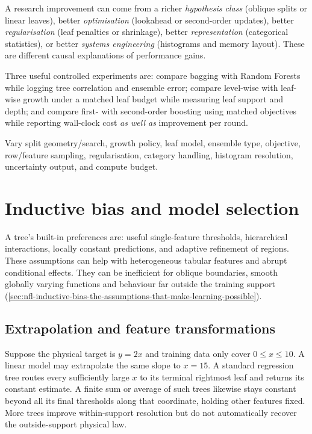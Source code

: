 A research improvement can come from a richer \emph{hypothesis class} (oblique splits or linear leaves), better \emph{optimisation} (lookahead or second-order updates), better \emph{regularisation} (leaf penalties or shrinkage), better \emph{representation} (categorical statistics), or better \emph{systems engineering} (histograms and memory layout).
These are different causal explanations of performance gains.

Three useful controlled experiments are: compare bagging with Random Forests while logging tree correlation and ensemble error; compare level-wise with leaf-wise growth under a matched leaf budget while measuring leaf support and depth; and compare first- with second-order boosting using matched objectives while reporting wall-clock cost \emph{as well as} improvement per round.

\begin{calloutdegreeofexperiment}
Vary split geometry/search, growth policy, leaf model, ensemble type, objective, row/feature sampling, regularisation, category handling, histogram resolution, uncertainty output, and compute budget.
\end{calloutdegreeofexperiment}

\section{Inductive bias and model selection}
\label{sec:trees-inductive-bias-and-model-selection}
A tree's built-in preferences are: useful single-feature thresholds, hierarchical interactions, locally constant predictions, and adaptive refinement of regions.
These assumptions can help with heterogeneous tabular features and abrupt conditional effects.
They can be inefficient for oblique boundaries, smooth globally varying functions and behaviour far outside the training support (\cref{sec:nfl-inductive-bias-the-assumptions-that-make-learning-possible}).

\subsection{Extrapolation and feature transformations}
\label{subsec:trees-extrapolation-and-feature-transformations}
Suppose the physical target is $y=2x$ and training data only cover $0\leq x\leq10$.
A linear model may extrapolate the same slope to $x=15$.
A standard regression tree routes every sufficiently large $x$ to its terminal rightmost leaf and returns its constant estimate.
A finite sum or average of such trees likewise stays constant beyond all its final thresholds along that coordinate, holding other features fixed.
More trees improve within-support resolution but do not automatically recover the outside-support physical law.

